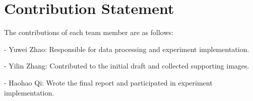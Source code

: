 \section{Contribution Statement}
The contributions of each team member are as follows:
    
- Yuwei Zhao: Responsible for data processing and experiment implementation.
    
- Yilin Zhang: Contributed to the initial draft and collected supporting images.
    
- Haohao Qi: Wrote the final report and participated in experiment implementation.